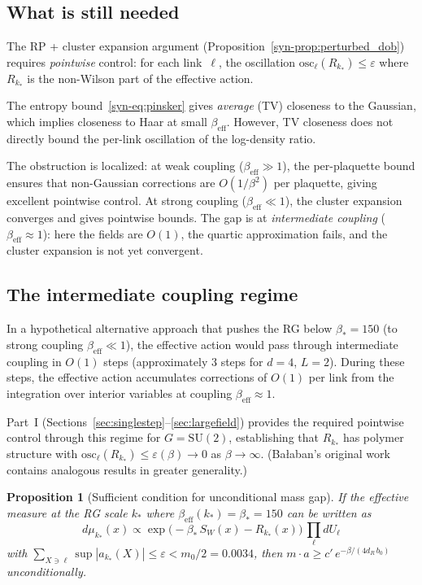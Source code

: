 \documentclass[11pt]{article}
\newtheorem{proposition}[theorem]{Proposition}
\theoremstyle{definition}
\newcommand{\SU}{\mathrm{SU}}
\newcommand{\osc}{\mathrm{osc}}
\begin{document}
\subsection{What is still needed}

The RP + cluster expansion argument
(Proposition~\ref{syn-prop:perturbed_dob})
requires \emph{pointwise} control: for each link~$\ell$,
the oscillation $\osc_\ell(R_{k_*}) \leq \varepsilon$
where $R_{k_*}$ is the non-Wilson part of the effective action.

The entropy bound~\eqref{syn-eq:pinsker} gives
\emph{average} (TV) closeness to the Gaussian, which
implies closeness to Haar at small $\beta_{\mathrm{eff}}$.
However, TV closeness does not directly bound the
per-link oscillation of the log-density ratio.

The obstruction is localized: at weak coupling
($\beta_{\mathrm{eff}} \gg 1$), the per-plaquette bound
ensures that non-Gaussian corrections are $O(1/\beta^2)$
per plaquette, giving excellent pointwise control.
At strong coupling ($\beta_{\mathrm{eff}} \ll 1$), the
cluster expansion converges and gives pointwise bounds.
The gap is at \emph{intermediate coupling}
($\beta_{\mathrm{eff}} \approx 1$): here the fields are
$O(1)$, the quartic approximation fails, and the cluster
expansion is not yet convergent.

\subsection{The intermediate coupling regime}

In a hypothetical alternative approach that pushes the RG
below $\beta_* = 150$ (to strong coupling $\beta_{\mathrm{eff}} \ll 1$),
the effective action would pass through intermediate coupling in
$O(1)$ steps (approximately $3$ steps for $d = 4$, $L = 2$).
During these steps, the effective action accumulates
corrections of $O(1)$ per link from the integration over
interior variables at coupling $\beta_{\mathrm{eff}} \approx 1$.

Part~I (Sections~\ref{sec:singlestep}--\ref{sec:largefield}) provides
the required pointwise control through this regime for
$G = \SU(2)$,
establishing that $R_{k_*}$ has polymer structure with
$\osc_\ell(R_{k_*}) \leq \varepsilon(\beta) \to 0$
as $\beta \to \infty$.
(Ba{\l}aban's original
work~\cite{Balaban85,Balaban89} contains analogous
results in greater generality.)

\begin{proposition}[Sufficient condition for unconditional
mass gap]\label{syn-prop:sufficient}
If the effective measure at the RG scale $k_*$ where
$\beta_{\mathrm{eff}}(k_*) = \beta_* = 150$ can be written as
\begin{equation}
  d\mu_{k_*}(x) \propto \exp\!\bigl(-\beta_*
  \,S_W(x) - R_{k_*}(x)\bigr)\,\prod_\ell dU_\ell
\end{equation}
with $\sum_{X \ni \ell} \sup |a_{k_*}(X)|
\leq \varepsilon < m_0/2 = 0.0034$,
then $m \cdot a \geq c'\,e^{-\beta/(4d_R\,b_0)}$
unconditionally.
\end{proposition}
\end{document}
